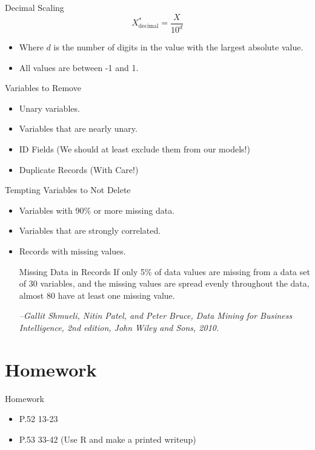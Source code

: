 \documentclass[handout]{beamer}
\begin{document}
\begin{frame}{Decimal Scaling}
\[
X^*_{\mathrm{decimal}} = \displaystyle\frac{X}{10^d}
\]

\begin{itemize}[<+->]
  \item Where $d$ is the number of digits in the value with the largest absolute value.
  \item All values are between -1 and 1.
\end{itemize}
\end{frame}

\begin{frame}{Variables to Remove}
  \begin{itemize}[<+->]
    \item Unary variables.
    \item Variables that are nearly unary.
    \item ID Fields (We should at least exclude them from our models!)
    \item Duplicate Records (With Care!)
  \end{itemize}
\end{frame}

\begin{frame}{Tempting Variables to Not Delete}
  \begin{itemize}[<+->]
  \item Variables with 90\% or more missing data.
  \item Variables that are strongly correlated.
  \item Records with missing values.
  \begin{block}{Missing Data in Records}
    If only 5\% of data values are missing
    from a data set of 30 variables, and the missing values are
    spread evenly throughout the data, almost 80%
    have at least one missing value.

   {\tiny \em --Gallit Shmueli, Nitin Patel, and Peter Bruce, Data Mining for
      Business Intelligence, 2nd edition, John Wiley and Sons, 2010. }
  \end{block}
    \end{itemize}
\end{frame}


\section{Homework}
\begin{frame}{Homework}
  \begin{itemize}
    \item P.52 13-23
    \item P.53 33-42 (Use R and make a printed writeup)
  \end{itemize}
\end{frame}
\end{document}
